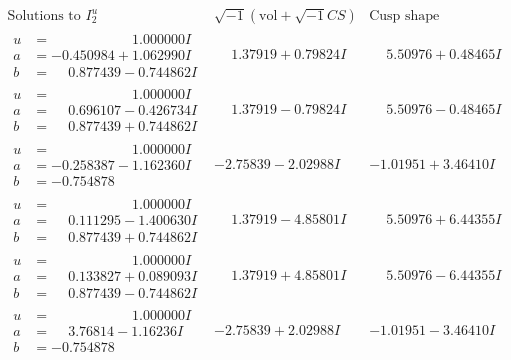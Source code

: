 \documentclass[1p]{elsarticle_modified}
\theoremstyle{definition}
\newcommand{\I}{\sqrt{-1}}
\begin{document}
$$\begin{array}{c|c|c}  
\text{Solutions to }I^u_{2}& \I (\text{vol} + \sqrt{-1}CS) & \text{Cusp shape}\\
 \hline 
\begin{aligned}
u &= \phantom{-0.000000 -}1.000000 I \\
a &= -0.450984 + 1.062990 I \\
b &= \phantom{-}0.877439 - 0.744862 I\end{aligned}
 & \phantom{-}1.37919 + 0.79824 I & \phantom{-}5.50976 + 0.48465 I \\ \hline\begin{aligned}
u &= \phantom{-0.000000 -}1.000000 I \\
a &= \phantom{-}0.696107 - 0.426734 I \\
b &= \phantom{-}0.877439 + 0.744862 I\end{aligned}
 & \phantom{-}1.37919 - 0.79824 I & \phantom{-}5.50976 - 0.48465 I \\ \hline\begin{aligned}
u &= \phantom{-0.000000 -}1.000000 I \\
a &= -0.258387 - 1.162360 I \\
b &= -0.754878\phantom{ +0.000000I}\end{aligned}
 & -2.75839 - 2.02988 I & -1.01951 + 3.46410 I \\ \hline\begin{aligned}
u &= \phantom{-0.000000 -}1.000000 I \\
a &= \phantom{-}0.111295 - 1.400630 I \\
b &= \phantom{-}0.877439 + 0.744862 I\end{aligned}
 & \phantom{-}1.37919 - 4.85801 I & \phantom{-}5.50976 + 6.44355 I \\ \hline\begin{aligned}
u &= \phantom{-0.000000 -}1.000000 I \\
a &= \phantom{-}0.133827 + 0.089093 I \\
b &= \phantom{-}0.877439 - 0.744862 I\end{aligned}
 & \phantom{-}1.37919 + 4.85801 I & \phantom{-}5.50976 - 6.44355 I \\ \hline\begin{aligned}
u &= \phantom{-0.000000 -}1.000000 I \\
a &= \phantom{-}3.76814 - 1.16236 I \\
b &= -0.754878\phantom{ +0.000000I}\end{aligned}
 & -2.75839 + 2.02988 I & -1.01951 - 3.46410 I \\ \hline\begin{aligned}

\end{aligned}
\end{array}$$
\end{document}
